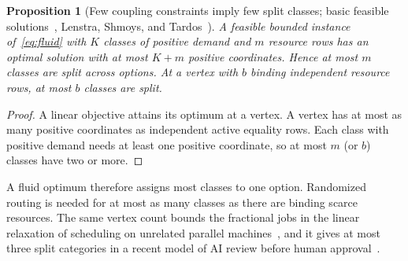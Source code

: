 \documentclass[11pt]{article}
\newtheorem{proposition}[theorem]{Proposition}
\theoremstyle{definition}
\theoremstyle{remark}
\begin{document}
\begin{proposition}[Few coupling constraints imply few split classes; basic feasible
solutions~\cite{bertsimas}, Lenstra, Shmoys, and Tardos~\cite{lst90}]\label{prop:split}
A feasible bounded instance of~\eqref{eq:fluid} with $K$ classes of positive demand and $m$ resource
rows has an optimal solution with at most $K+m$ positive coordinates. Hence at most $m$ classes are
split across options. At a vertex with $b$ binding independent resource rows, at most $b$ classes are
split.
\end{proposition}
\begin{proof}
A linear objective attains its optimum at a vertex. A vertex has at most as many positive coordinates
as independent active equality rows. Each class with positive demand needs at least one positive
coordinate, so at most $m$ (or $b$) classes have two or more.
\end{proof}
A fluid optimum therefore assigns most classes to one option. Randomized routing is needed for at
most as many classes as there are binding scarce resources. The same vertex count bounds the
fractional jobs in the linear relaxation of scheduling on unrelated parallel machines~\cite{lst90}, and
it gives at most three split categories in a recent model of AI review before human
approval~\cite{linzhang26}.
\end{document}
